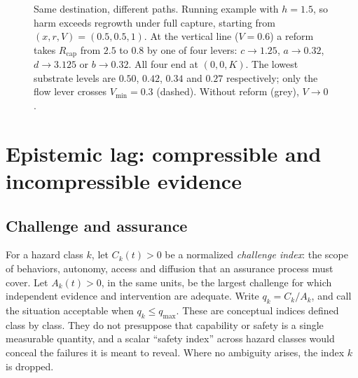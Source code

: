 \documentclass[11pt]{article}
\theoremstyle{plain}
\theoremstyle{definition}
\newcommand{\Rcap}{R_{\mathrm{cap}}}
\newcommand{\Vmin}{V_{\min}}
\newcommand{\qmax}{q_{\max}}
\begin{document}
\begin{figure}[t]
\caption{Same destination, different paths. Running example with $h=1.5$, so harm exceeds regrowth under full capture, starting from $(x,r,V)=(0.5,0.5,1)$. At the vertical line ($V=0.6$) a reform takes $\Rcap$ from $2.5$ to $0.8$ by one of four levers: $c\to1.25$, $a\to0.32$, $d\to3.125$ or $b\to0.32$. All four end at $(0,0,K)$. The lowest substrate levels are $0.50$, $0.42$, $0.34$ and $0.27$ respectively; only the flow lever crosses $\Vmin=0.3$ (dashed). Without reform (grey), $V\to0$.}
\label{fig:levers}
\end{figure}

\section{Epistemic lag: compressible and incompressible evidence}\label{sec:lag}

\subsection{Challenge and assurance}

For a hazard class $k$, let $C_k(t)>0$ be a normalized \emph{challenge index}: the scope of behaviors, autonomy, access and diffusion that an assurance process must cover. Let $A_k(t)>0$, in the same units, be the largest challenge for which independent evidence and intervention are adequate. Write $q_k=C_k/A_k$, and call the situation acceptable when $q_k\le\qmax$. These are conceptual indices defined class by class. They do not presuppose that capability or safety is a single measurable quantity, and a scalar ``safety index'' across hazard classes would conceal the failures it is meant to reveal. Where no ambiguity arises, the index $k$ is dropped.
\end{document}
